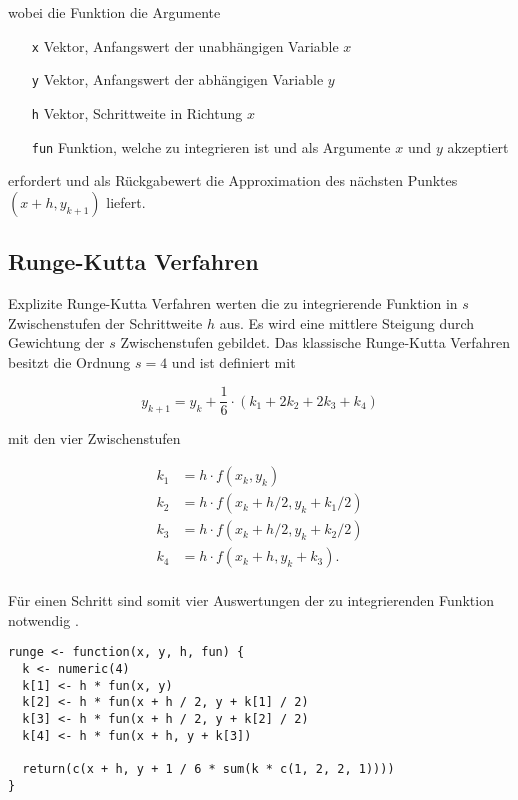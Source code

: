 wobei die Funktion die Argumente 

\begin{itemize}
  \item[\texttt{x}] Vektor, Anfangswert der unabhängigen Variable $x$
  \item[\texttt{y}] Vektor, Anfangswert der abhängigen Variable $y$
  \item[\texttt{h}] Vektor, Schrittweite in Richtung $x$
  \item[\texttt{fun}] Funktion, welche zu integrieren ist und als Argumente $x$ und $y$ akzeptiert
\end{itemize}

erfordert und als Rückgabewert die Approximation des nächsten Punktes $(x+h, y_{k+1})$ liefert.


\subsection{Runge-Kutta Verfahren}
Explizite Runge-Kutta Verfahren werten die zu integrierende Funktion in $s$ Zwischenstufen der Schrittweite $h$ aus. Es wird eine mittlere Steigung durch Gewichtung der $s$ Zwischenstufen gebildet. Das klassische Runge-Kutta Verfahren besitzt die Ordnung $s=4$ und ist  definiert mit 

\begin{equation*}
  y_{k+1} = y_k + \frac{1}{6} \cdot (k_1 + 2 k_2 + 2 k_3 + k_4)
\end{equation*}

mit den vier Zwischenstufen

\begin{align*}
  k_1 &= h \cdot f(x_k, y_k)\\
  k_2 &= h \cdot f(x_k + h / 2, y_k + k_1 / 2)\\
  k_3 &= h \cdot f(x_k + h / 2, y_k + k_2 / 2)\\
  k_4 &= h \cdot f(x_k + h, y_k + k_3).\\
\end{align*}

Für einen Schritt sind somit vier Auswertungen der zu integrierenden Funktion notwendig \cite{papula}. 

\begin{lstlisting}[style=code]  
runge <- function(x, y, h, fun) {
  k <- numeric(4)
  k[1] <- h * fun(x, y)
  k[2] <- h * fun(x + h / 2, y + k[1] / 2)
  k[3] <- h * fun(x + h / 2, y + k[2] / 2)
  k[4] <- h * fun(x + h, y + k[3]) 
  
  return(c(x + h, y + 1 / 6 * sum(k * c(1, 2, 2, 1))))
}
\end{lstlisting}

